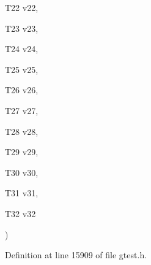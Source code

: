 {{\begin{DoxyParamCaption}
\item[{\-T22}]{v22, }
\item[{\-T23}]{v23, }
\item[{\-T24}]{v24, }
\item[{\-T25}]{v25, }
\item[{\-T26}]{v26, }
\item[{\-T27}]{v27, }
\item[{\-T28}]{v28, }
\item[{\-T29}]{v29, }
\item[{\-T30}]{v30, }
\item[{\-T31}]{v31, }
\item[{\-T32}]{v32}
\end{DoxyParamCaption}
)}}\label{d0/d75/namespacetesting_afeff614d4c808c753bbfa208409ad664}


\-Definition at line 15909 of file gtest.\-h.


